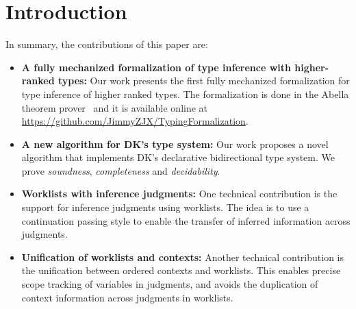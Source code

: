 \section{Introduction}





In summary, the contributions of this paper are:

\begin{itemize}

\item {\bf A fully mechanized formalization of type inference with
  higher-ranked types:} Our work presents the first fully mechanized formalization
  for type inference of higher ranked types. The formalization is done in the
  Abella theorem prover~\citep{AbellaDesc} and it is available
  online at \url{https://github.com/JimmyZJX/TypingFormalization}.

\item {\bf A new algorithm for DK's type system:} Our work proposes a novel algorithm that implements
  DK's declarative bidirectional type system. We prove
  \emph{soundness}, \emph{completeness} and
  \emph{decidability}. 

\item {\bf Worklists with inference judgments:} One technical contribution is the
  support for inference judgments using worklists. The idea is to
  use a continuation passing style to enable the transfer of inferred information across
  judgments. 

\item {\bf Unification of worklists and contexts:} Another technical contribution is the unification
  between ordered contexts and worklists. This enables precise scope tracking
  of variables in judgments, and avoids the duplication of context information across
  judgments in worklists.

\begin{comment}
\jimmy{Notes @20190211 4 points of novalty:\\
1) Dealing with inference judgments and CPS-style chains\\
2) The form of the judgment itself with a single shared context\\
3) The way we deal with scope (which may follow from 2)\\
4) Immediate substitution (judgment list)
}
\end{comment}

\end{itemize}
